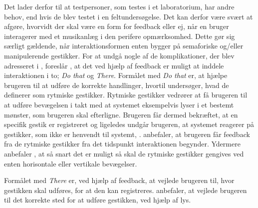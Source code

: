 Det lader derfor til at testpersoner, som testes i et laboratorium, har andre behov, end hvis de blev testet i en feltundersøgelse. Det kan derfor være svært at afgøre, hvorvidt der skal være en form for feedback eller ej, når en bruger interagerer med et musikanlæg i den perifere opmærksomhed. Dette gør sig særligt gældende, når interaktionsformen enten bygger på semaforiske og/eller manipulerende gestikker. \blankline 
%
For at undgå nogle af de komplikationer, der blev adresseret i , foreslår \textcite{PDF:DoThatThere}, at det ved hjælp af feedback er muligt at inddele interaktionen i to; \textit{Do that} og \textit{There}. Formålet med \textit{Do that} er, at hjælpe brugeren til at udføre de korrekte handlinger, hvortil \textcite[s. 4]{PDF:DoThatThere} undersøger, hvad de definerer som rytmiske gestikker. Rytmiske gestikker vedrører at få brugeren til at udføre bevægelsen i takt med at systemet eksempelvis lyser i et bestemt mønster, som brugeren skal efterligne. Brugeren får dermed bekræftet, at en specifik gestik er registreret og ligeledes undgår brugeren, at systemet reagerer på gestikker, som ikke er henvendt til systemt, \parencite[s. 4]{PDF:DoThatThere}. \textcite[s. 10]{PDF:DoThatThere} anbefaler, at brugeren får feedback fra de rytmiske gestikker fra det tidspunkt interaktionen begynder. Ydermere anbefaler \textcite[s. 10]{PDF:DoThatThere}, at så snart det er muligt så skal de rytmiske gestikker gengives ved enten horisontale eller vertikale bevægelser. 

Formålet med \textit{There} er, ved hjælp af feedback, at vejlede brugeren til, hvor gestikken skal udføres, for at den kan registreres. \textcite[s. 10]{PDF:DoThatThere} anbefaler, at vejlede brugeren til det korrekte sted for at udføre gestikken, ved hjælp af lys. 
